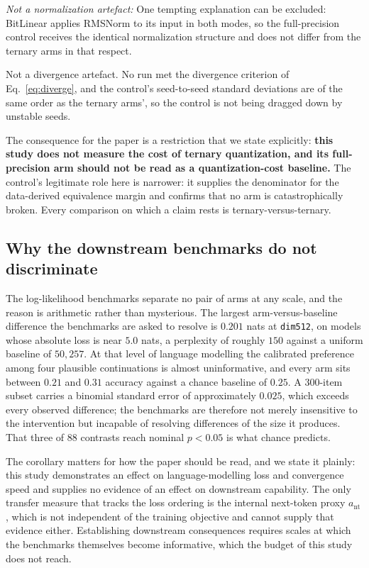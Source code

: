 \documentclass[final,5p,times,twocolumn]{elsarticle}
\theoremstyle{remark}
\begin{document}
\textit{Not a normalization artefact:} One tempting explanation can be excluded:
BitLinear applies RMSNorm to its input in both modes, so the
full-precision control receives the identical normalization structure and does
not differ from the ternary arms in that respect.

Not a divergence artefact. No run met the divergence criterion of
Eq.~\eqref{eq:diverge}, and the
control's seed-to-seed standard deviations are of the same order as the
ternary arms',
so the control is not being dragged down by unstable seeds.

The consequence for the paper is a restriction that we state explicitly:
\textbf{this study does not measure the cost of ternary quantization, and its
full-precision arm should not be read as a quantization-cost baseline.} The
control's legitimate role here is narrower: it supplies the denominator for
the data-derived equivalence margin and confirms that no arm is catastrophically
broken. Every comparison on which a claim rests is ternary-versus-ternary.

\subsection{Why the downstream benchmarks do not discriminate}
\label{sec:disc-downstream}

The log-likelihood benchmarks separate no pair of arms at any scale, and the
reason is arithmetic rather than mysterious. The largest arm-versus-baseline
difference the benchmarks are asked to resolve is $0.201$ nats at
\texttt{dim512}, on models
whose absolute loss is near $5.0$ nats, a perplexity of roughly $150$ against
a uniform baseline of $50{,}257$. At that level of language modelling the
calibrated preference among four plausible continuations is almost
uninformative, and every arm sits between $0.21$ and $0.31$ accuracy against a
chance baseline of $0.25$. A $300$-item subset carries a binomial standard
error of approximately $0.025$, which exceeds every observed
difference; the benchmarks are therefore not merely insensitive to the
intervention but incapable of resolving differences of the size it produces.
That three of $88$ contrasts reach nominal $p<0.05$ is what chance predicts.

The corollary matters for how the paper should be read, and we state it
plainly: this study demonstrates an effect on language-modelling loss and
convergence speed and supplies no evidence of an effect on downstream
capability. The only transfer measure that tracks the loss ordering is the
internal next-token proxy $a_{\mathrm{nt}}$, which is not independent of the
training objective and cannot supply that evidence either. Establishing
downstream consequences requires scales at which the benchmarks themselves
become informative, which the budget of this study does not reach.
\end{document}
